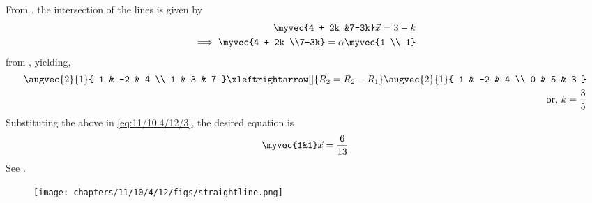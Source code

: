 		From ,
the intersection of the lines is given by 
		\begin{align}
       \myvec{4 + 2k &7-3k}\vec{x}=3-k
       \label{eq:11/10.4/12/3}
       \\
       \implies \myvec{4 + 2k \\7-3k} = \alpha\myvec{1 \\ 1} 
		\end{align}
			from  , yielding,
		\begin{align}
	\augvec{2}{1}{
				1 & -2 & 4
				\\
				1 & 3 & 7
			}
			\xleftrightarrow[]{R_2 = R_2 -R_1}
	\augvec{2}{1}{
				1 & -2 & 4
				\\
				0 & 5 & 3 
			}
			\\
			\text{or, } k = \frac{3}{5}
       \label{eq:11/10.4/12/4}
   \end{align}
 Substituting the above  
in       \eqref{eq:11/10.4/12/3}, the desired equation is 
    \begin{align}
        \myvec{1&1}\vec{x}=\frac{6}{13}
    \end{align}
    See
    .
\begin{figure}[H]
    \centering
    \texttt{[image: chapters/11/10/4/12/figs/straightline.png]}
    \caption{}
    \label{fig:enter-label}
\end{figure}
